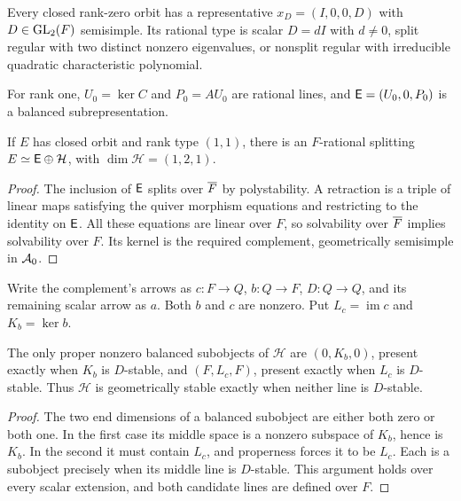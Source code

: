 \begin{proposition}\label{m1:prop:rankzero}\label{m1:prop:rank00-classification}
Every closed rank-zero orbit has a representative
$x_D=(I,0,0,D)$ with $D\in\operatorname{GL}_2(F)$ semisimple. Its rational type is
scalar $D=dI$ with $d\neq0$, split regular with two distinct nonzero
eigenvalues, or nonsplit regular with irreducible quadratic characteristic
polynomial.
\end{proposition}

For rank one, $U_0=\ker C$ and $P_0=AU_0$ are rational lines, and
$\mathsf E=(U_0,0,P_0)$ is a balanced subrepresentation.

\begin{lemma}\label{m1:lem:rank11-split}
If $E$ has closed orbit and rank type $(1,1)$, there is an $F$-rational
splitting $E\simeq\mathsf E\oplus\mathcal H$, with
$\dim\mathcal H=(1,2,1)$.
\end{lemma}
\begin{proof}
The inclusion of $\mathsf E$ splits over $\overline F$ by polystability. A retraction
is a triple of linear maps satisfying the quiver morphism equations and
restricting to the identity on $\mathsf E$. All these equations are linear
over $F$, so solvability over $\overline F$ implies solvability over $F$. Its
kernel is the required complement, geometrically semisimple in
$\mathcal A_0$.
\end{proof}
Write the complement's arrows as $c:F\to Q$, $b:Q\to F$, $D:Q\to Q$,
and its remaining scalar arrow as $a$. Both $b$ and $c$ are nonzero.
Put $L_c=\operatorname{im}c$ and $K_b=\ker b$.

\begin{lemma}\label{m1:lem:rank11-balanced}
The only proper nonzero balanced subobjects of $\mathcal H$ are
$(0,K_b,0)$, present exactly when $K_b$ is $D$-stable, and
$(F,L_c,F)$, present exactly when $L_c$ is $D$-stable. Thus $\mathcal H$
is geometrically stable exactly when neither line is $D$-stable.
\end{lemma}
\begin{proof}
The two end dimensions of a balanced subobject are either both zero or
both one. In the first case its middle space is a nonzero subspace of
$K_b$, hence is $K_b$. In the second it must contain $L_c$, and
properness forces it to be $L_c$. Each is a subobject precisely when
its middle line is $D$-stable. This argument holds over every scalar
extension, and both candidate lines are defined over $F$.
\end{proof}

